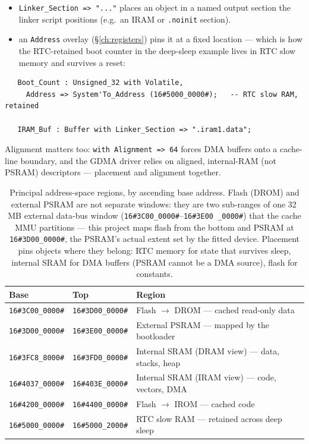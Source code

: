 \begin{itemize}
  \item \texttt{Linker\_Section => "..."} places an object in a named output
        section the linker script positions (e.g.\ an IRAM or \texttt{.noinit}
        section).
  \item an \texttt{Address} overlay (\S\ref{ch:registers}) pins it at a fixed
        location --- which is how the RTC-retained boot counter in the deep-sleep
        example lives in RTC slow memory and survives a reset:
\end{itemize}

\begin{lstlisting}
   Boot_Count : Unsigned_32 with Volatile,
     Address => System'To_Address (16#5000_0000#);   -- RTC slow RAM, retained

   IRAM_Buf : Buffer with Linker_Section => ".iram1.data";
\end{lstlisting}

Alignment matters too: \texttt{with Alignment => 64} forces DMA buffers onto a
cache-line boundary, and the GDMA driver relies on aligned, internal-RAM (not
PSRAM) descriptors --- placement and alignment together.

\begin{table}[ht]
\centering
\begin{tabular}{@{}l l l@{}}
\toprule
\textbf{Base} & \textbf{Top} & \textbf{Region} \\ \midrule
\texttt{16\#3C00\_0000\#} & \texttt{16\#3D00\_0000\#} & Flash $\to$ DROM --- cached read-only data \\
\texttt{16\#3D00\_0000\#} & \texttt{16\#3E00\_0000\#} & External PSRAM --- mapped by the bootloader \\
\texttt{16\#3FC8\_8000\#} & \texttt{16\#3FD0\_0000\#} & Internal SRAM (DRAM view) --- data, stacks, heap \\
\texttt{16\#4037\_0000\#} & \texttt{16\#403E\_0000\#} & Internal SRAM (IRAM view) --- code, vectors, DMA \\
\texttt{16\#4200\_0000\#} & \texttt{16\#4400\_0000\#} & Flash $\to$ IROM --- cached code \\
\texttt{16\#5000\_0000\#} & \texttt{16\#5000\_2000\#} & RTC slow RAM --- retained across deep sleep \\
\bottomrule
\end{tabular}
\caption{Principal address-space regions, by ascending base address. Flash
(DROM) and external PSRAM are not separate windows: they are two sub-ranges of
one 32\,MB external data-bus window (\texttt{16\#3C00\_0000\#}--\texttt{16\#3E00%
\_0000\#}) that the cache MMU partitions --- this project maps flash from the
bottom and PSRAM at \texttt{16\#3D00\_0000\#}, the PSRAM's actual extent set by
the fitted device. Placement pins objects where they belong: RTC memory for
state that survives sleep, internal SRAM for DMA buffers (PSRAM cannot be a DMA
source), flash for constants.}
\label{tab:memmap}
\end{table}

